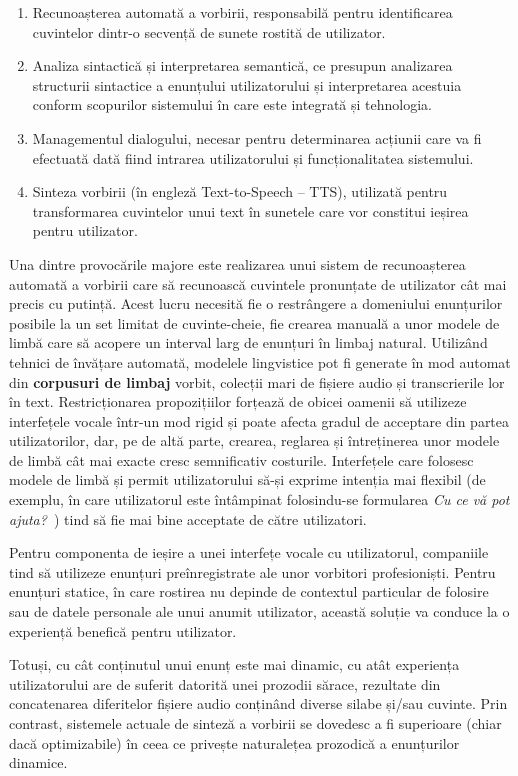 \begin{multicols}{2}
\begin{enumerate}
\item Recunoașterea automată a vorbirii, responsabilă pentru identificarea cuvintelor dintr-o secvență de sunete rostită de utilizator.
\item Analiza sintactică și interpretarea semantică, ce presupun analizarea structurii sintactice a enunțului utilizatorului și interpretarea acestuia conform scopurilor sistemului în care este integrată și tehnologia.
\item Managementul dialogului, necesar pentru determinarea acțiunii care va fi efectuată dată fiind intrarea utilizatorului și funcționalitatea sistemului.
\item Sinteza vorbirii (în engleză Text-to-Speech – TTS), utilizată pentru transformarea cuvintelor unui text în sunetele care vor constitui ieșirea pentru utilizator.
\end{enumerate}

Una dintre provocările majore este realizarea unui sistem de recunoașterea automată a vorbirii care să recunoască cuvintele pronunțate de utilizator cât mai precis cu putință. Acest lucru necesită fie o restrângere a domeniului enunțurilor posibile la un set limitat de cuvinte-cheie, fie crearea manuală a unor modele de limbă care să acopere un interval larg de enunțuri în limbaj natural. Utilizând tehnici de învățare automată, modelele lingvistice pot fi generate în mod automat din \textbf{corpusuri de limbaj} vorbit, colecții mari de fișiere audio și transcrierile lor în text. Restricționarea propozițiilor forțează de obicei oamenii să utilizeze interfețele vocale într-un mod rigid și poate afecta gradul de acceptare din partea utilizatorilor, dar, pe de altă parte, crearea, reglarea și întreținerea unor modele de limbă cât mai exacte cresc semnificativ costurile. Interfețele care folosesc modele de limbă și permit utilizatorului să-și exprime intenția mai flexibil (de exemplu, în care utilizatorul este întâmpinat folosindu-se formularea \textit{Cu ce vă pot ajuta?}~) tind să fie mai bine acceptate de către utilizatori.

Pentru componenta de ieșire a unei interfețe vocale cu utilizatorul, companiile tind să utilizeze enunțuri preînregistrate ale unor vorbitori profesioniști. Pentru enunțuri statice, în care rostirea nu depinde de contextul particular de folosire sau de datele personale ale unui anumit utilizator, această soluție va conduce la o experiență benefică pentru utilizator. 

Totuși, cu cât conținutul unui enunț este mai dinamic, cu atât experiența utilizatorului are de suferit datorită unei prozodii sărace, rezultate din concatenarea diferitelor fișiere audio conținând diverse silabe și/sau cuvinte. Prin contrast, sistemele actuale de sinteză a vorbirii se dovedesc a fi superioare (chiar dacă optimizabile) în ceea ce privește naturalețea prozodică a enunțurilor dinamice. 


\end{multicols}
